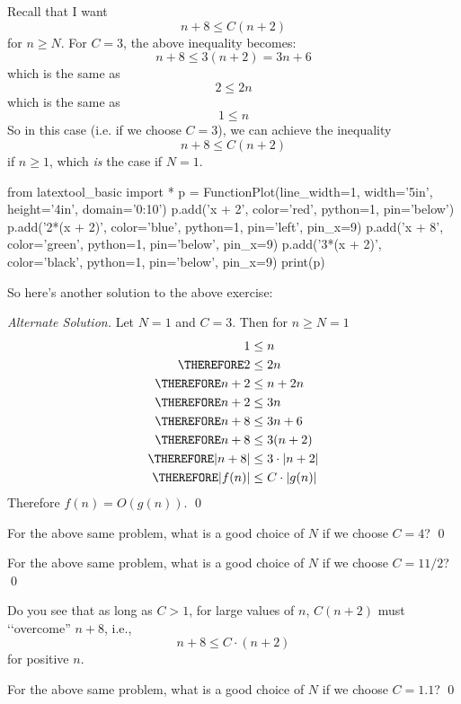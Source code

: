Recall that I want
\[
n + 8 \leq C(n + 2)
\]
for $n \geq N$.
For $C = 3$, the above inequality becomes:
\[
n + 8 \leq 3(n + 2) = 3n + 6
\]
which is the same as
\[
2 \leq 2n
\]
which is the same as 
\[
1 \leq n
\]
So in this case (i.e. if we choose $C = 3$), we can achieve
the inequality
\[
n + 8 \leq C(n + 2)
\]
if $n \geq 1$, which \textit{is} the case if $N = 1$. 

\begin{python}
from latextool_basic import *
p = FunctionPlot(line_width=1, width='5in', height='4in', domain='0:10')
p.add('x + 2', color='red', python=1, pin='below')
p.add('2*(x + 2)', color='blue', python=1, pin='left', pin_x=9)
p.add('x + 8', color='green', python=1, pin='below', pin_x=9)
p.add('3*(x + 2)', color='black', python=1, pin='below', pin_x=9)
print(p)
\end{python}

So here's another solution to the above exercise:

\textit{Alternate Solution.}
Let $N = 1$ and $C = 3$. Then
for $n \geq N = 1$
\begin{align*}
1 &\leq n \\
\THEREFORE 2 &\leq 2n \\
\THEREFORE n + 2 &\leq n + 2n \\
\THEREFORE n + 2 &\leq 3n \\
\THEREFORE n + 8 &\leq 3n + 6\\
\THEREFORE n + 8 &\leq 3(n + 2)\\
\THEREFORE |n + 8| &\leq 3 \cdot |n + 2|\\
\THEREFORE |f(n)| &\leq C \cdot |g(n)|
\end{align*}
Therefore $f(n) = O(g(n))$.
\qed

\begin{ex}
For the above same problem, what is a good choice of $N$ 
if we choose $C = 4$?
\qed
\end{ex}

\begin{ex}
For the above same problem, what is a good choice of $N$ 
if we choose $C = 11/2$?
\qed
\end{ex}

Do you see that as long as $C > 1$, for large values of $n$,
$C(n + 2)$ must \lq\lq overcome'' $n + 8$, i.e.,
\[
n + 8 \leq C \cdot (n + 2)
\]
for positive $n$.

\begin{ex}
For the above same problem, what is a good choice of $N$ 
if we choose $C = 1.1$?
\qed
\end{ex}

